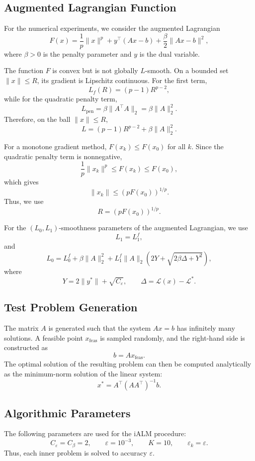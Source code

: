\documentclass[runningheads]{llncs}
\begin{document}
	\subsection{Augmented Lagrangian Function}
	
	For the numerical experiments, we consider the augmented Lagrangian
	$$
	F(x)
	=
	\frac{1}{p}\|x\|^p
	+
	y^\top(Ax-b)
	+
	\frac{\beta}{2}\|Ax-b\|^2,
	$$
	where $\beta>0$ is the penalty parameter and $y$ is the dual variable.
	
	The function $F$ is convex but is not globally $L$-smooth. On a bounded set $\|x\|\leq R$, its gradient is Lipschitz continuous. For the first term,
	$$
	L_f(R)=(p-1)R^{p-2},
	$$
	while for the quadratic penalty term,
	$$
	L_{\mathrm{pen}}
	=
	\beta\|A^\top A\|_2
	=
	\beta\|A\|_2^2.
	$$
	Therefore, on the ball $\|x\|\leq R$,
	$$
	\boxed{
		L=(p-1)R^{p-2}+\beta\|A\|_2^2.
	}
	$$
	
	For a monotone gradient method, $F(x_k)\leq F(x_0)$ for all $k$. Since the quadratic penalty term is nonnegative,
	$$
	\frac{1}{p}\|x_k\|^p
	\leq
	F(x_k)
	\leq
	F(x_0),
	$$
	which gives
	$$
	\|x_k\|
	\leq
	\left(pF(x_0)\right)^{1/p}.
	$$
	Thus, we use
	$$
	\boxed{
		R=\left(pF(x_0)\right)^{1/p}.
	}
	$$
	
	For the $(L_0,L_1)$-smoothness parameters of the augmented Lagrangian, we use
	$$
	L_1=L_1^f,
	$$
	and
	$$
	L_0
	=
	L_0^f
	+
	\beta\|A\|_2^2
	+
	L_1^f\|A\|_2
	\left(
	2Y+\sqrt{2\beta\Delta+Y^2}
	\right),
	$$
	where
	$$
	Y=2\|y^*\|+\sqrt{C_\varepsilon},
	\qquad
	\Delta=\mathcal{L}(x)-\mathcal{L}^*.
	$$
	
	\subsection{Test Problem Generation}
	
	The matrix $A$ is generated such that the system $Ax=b$ has infinitely many solutions. A feasible point $x_{\mathrm{feas}}$ is sampled randomly, and the right-hand side is constructed as
	$$
	b=Ax_{\mathrm{feas}}.
	$$
	The optimal solution of the resulting problem can then be computed analytically as the minimum-norm solution of the linear system:
	$$
	\boxed{
		x^*
		=
		A^\top(AA^\top)^{-1}b.
	}
	$$
	
	\subsection{Algorithmic Parameters}
	
	The following parameters are used for the iALM procedure:
	$$
	C_\varepsilon=C_\beta=2,
	\qquad
	\varepsilon=10^{-3},
	\qquad
	K=10,
	\qquad
	\varepsilon_k=\varepsilon.
	$$
	Thus, each inner problem is solved to accuracy $\varepsilon$.
	
\end{document}
